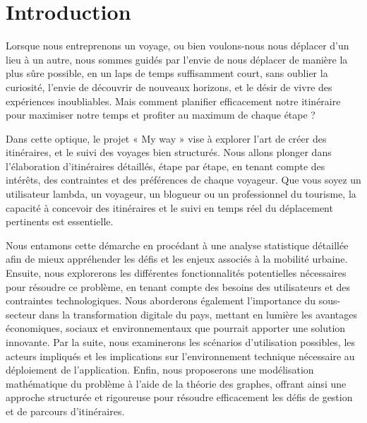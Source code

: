 \documentclass{article}
\date{}
\begin{document}
\renewcommand{\contentsname}{Table des matières}
\tableofcontents

\clearpage


\maketitle

\section * {Introduction}
Lorsque nous entreprenons un voyage, ou bien voulons-nous nous déplacer d’un lieu à un autre, nous sommes guidés par l’envie de nous déplacer de manière la plus sûre possible, en un laps de temps suffisamment court, sans oublier la curiosité, l’envie de découvrir de nouveaux horizons, et le désir de vivre des expériences inoubliables. Mais comment planifier efficacement notre itinéraire pour maximiser notre temps et profiter au maximum de chaque étape ? 

Dans cette optique, le projet « My way » vise à explorer l’art de créer des itinéraires, et le suivi des voyages bien structurés. Nous allons plonger dans l’élaboration d’itinéraires détaillés, étape par étape, en tenant compte des intérêts, des contraintes et des préférences de chaque voyageur. Que vous soyez un utilisateur lambda, un voyageur, un blogueur ou un professionnel du tourisme, la capacité à concevoir des itinéraires et le suivi en temps réel du déplacement pertinents est essentielle.


Nous entamons cette démarche en procédant à une analyse statistique détaillée afin de mieux appréhender les défis et les enjeux associés à la mobilité urbaine. Ensuite, nous explorerons les différentes fonctionnalités potentielles nécessaires pour résoudre ce problème, en tenant compte des besoins des utilisateurs et des contraintes technologiques. Nous aborderons également l’importance du sous-secteur dans la transformation digitale du pays, mettant en lumière les avantages économiques, sociaux et environnementaux que pourrait apporter une solution innovante. Par la suite, nous examinerons les scénarios d’utilisation possibles, les acteurs impliqués et les implications sur l’environnement technique nécessaire au déploiement de l’application. Enfin, nous proposerons une modélisation mathématique du problème à l’aide de la théorie des graphes, offrant ainsi une approche structurée et rigoureuse pour résoudre efficacement les défis de gestion et de parcours d’itinéraires.
\end{document}
